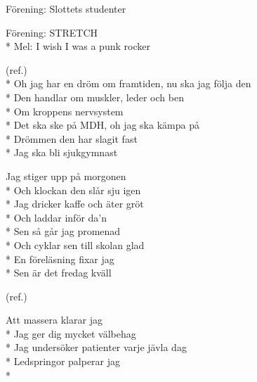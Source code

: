 \begin{SongText}[???]
    \begin{SongInfo}
        Förening: Slottets studenter
    \end{SongInfo}
    \begin{SongVerse}
        [NO SONG]
    \end{SongVerse}
\end{SongText}

\begin{SongText}[Sjukgymnastlåten]
    \begin{SongInfo}
        Förening: STRETCH\\*%
        Mel:  I wish I was a punk rocker
    \end{SongInfo}
    \begin{SongVerse}
        (ref.)\\*%
        Oh jag har en dröm om framtiden, nu ska jag följa den\\*%
        Den handlar om muskler, leder och ben\\*%
        Om kroppens nervsystem\\*%
        Det ska ske på MDH, oh jag ska kämpa på\\*%
        Drömmen den har slagit fast\\*%
        Jag ska bli sjukgymnast
    \end{SongVerse}
    \begin{SongVerse}
        Jag stiger upp på morgonen\\*%
        Och klockan den slår sju igen\\*%
        Jag dricker kaffe och äter gröt\\*%
        Och laddar inför da’n\\*%
        Sen så går jag promenad\\*%
        Och cyklar sen till skolan glad\\*%
        En föreläsning fixar jag\\*%
        Sen är det fredag kväll
    \end{SongVerse}
    \begin{SongVerse}
        (ref.)
    \end{SongVerse}
    \begin{SongVerse}
        Att massera klarar jag\\*%
        Jag ger dig mycket välbehag\\*%
        Jag undersöker patienter varje jävla dag\\*%
        Ledspringor palperar jag\\*%

\end{SongVerse}
\end{SongText}
